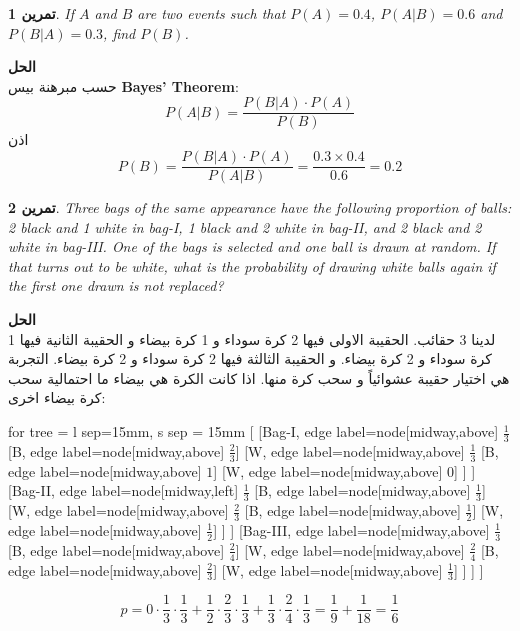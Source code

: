 \documentclass[14pt, a4paper, leqno]{extarticle}
\newcommand{\en}{\textenglish}
\theoremstyle{theoremstyle}
\newtheorem{example}{تمرين}
\newenvironment{solution}{\noindent\textbf{الحل}\vspace{3pt}\\}{}
\begin{document}
	\begin{example}
		\en{If \(A\) and \(B\) are two events such that \(P(A) = 0.4\), \(P(A|B) = 0.6\) and \(P(B|A) = 0.3\), find \(P(B)\).}
	\end{example}
	
	\begin{solution}
		حسب مبرهنة بيس \en{\bfseries Bayes' Theorem}:
		\[
		P(A|B) = \frac{P(B|A) \cdot P(A)}{P(B)}
		\]
		اذن
		\[
		P(B) = \frac{P(B|A) \cdot P(A)}{P(A|B)} = \frac{0.3 \times 0.4}{0.6} = 0.2
		\]
	\end{solution}
	
	\begin{example}
		\en{Three bags of the same appearance have the following proportion of balls: 2 black and 1 white in bag-I, 1 black and 2 white in bag-II, and 2 black and 2 white in bag-III. One of the bags is selected and one ball is drawn at random. If that turns out to be white, what is the probability of drawing white balls again if the first one drawn is not replaced?}
	\end{example}
		
		\begin{solution}
			لدينا 3 حقائب. الحقيبة الاولى فيها 2 كرة سوداء و 1 كرة بيضاء و الحقيبة الثانية فيها 1 كرة سوداء و 2 كرة بيضاء. و الحقيبة الثالثة فيها 2 كرة سوداء و 2 كرة بيضاء. التجربة هي اختيار حقيبة عشوائياً و سحب كرة منها. اذا كانت الكرة هي بيضاء ما احتمالية سحب كرة بيضاء اخرى:
			\begin{center}
			\begin{forest}
				for tree = {l sep=15mm, s sep = 15mm}
				[
				[Bag-I, edge label={node[midway,above] {$\frac{1}{3}$}}
				[B, edge label={node[midway,above] {$\frac{2}{3}$}}]
			    [W, edge label={node[midway,above] {$\frac{1}{3}$}}
			    [B, edge label={node[midway,above] {$1$}}]
			    [W, edge label={node[midway,above] {$0$}}]
			    ]
				]
				[Bag-II, edge label={node[midway,left] {$\frac{1}{3}$}}
				[B, edge label={node[midway,above] {$\frac{1}{3}$}}]
				[W, edge label={node[midway,above] {$\frac{2}{3}$}}
				[B, edge label={node[midway,above] {$\frac{1}{2}$}}]
				[W, edge label={node[midway,above] {$\frac{1}{2}$}}]
				]
				]
				[Bag-III, edge label={node[midway,above] {$\frac{1}{3}$}}
				[B, edge label={node[midway,above] {$\frac{2}{4}$}}]
				[W, edge label={node[midway,above] {$\frac{2}{4}$}}
				[B, edge label={node[midway,above] {$\frac{2}{3}$}}]
				[W, edge label={node[midway,above] {$\frac{1}{3}$}}]
				]
				]
				]
			\end{forest}
		\end{center}
		\[
		p = 0\cdot\frac{1}{3}\cdot\frac{1}{3} + \frac{1}{2}\cdot\frac{2}{3}\cdot\frac{1}{3} + \frac{1}{3}\cdot\frac{2}{4}\cdot\frac{1}{3} = \frac{1}{9} + \frac{1}{18} = \frac{1}{6}
		\]
		\end{solution}
	
\end{document}
